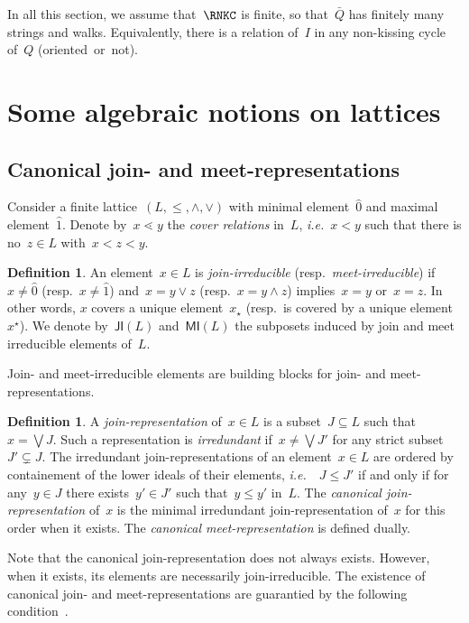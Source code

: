 \documentclass{amsart}
\theoremstyle{definition}
\newtheorem{definition}[theorem]{Definition}
\newcommand{\ie}{\textit{i.e.}~} %
\newcommand{\darkblue}{\color{darkblue}} %
\newcommand{\defn}[1]{\textsl{\darkblue #1}} %
\newcommand{\meet}{\wedge} %
\newcommand{\join}{\vee} %
\newcommand{\bigJoin}{\bigvee} %
\newcommand{\JI}{\mathsf{JI}} %
\newcommand{\MI}{\mathsf{MI}} %
\begin{document}
In all this section, we assume that~$\RNKC$ is finite, so that~$\bar Q$ has finitely many strings and walks.
Equivalently, there is a relation of~$I$ in any non-kissing cycle of~$Q$ (oriented~or~not).

\section{Some algebraic notions on lattices}
\label{sec:recollectionLattice}

\subsection{Canonical join- and meet-representations}
\label{subsec:joinIrreducibleRep}

Consider a finite lattice~$(L,\le,\meet,\join)$ with minimal element~$\hat 0$ and maximal element~$\hat 1$.
Denote by~$x \lessdot y$ the \defn{cover relations} in~$L$, \ie $x < y$ such that there is no~$z \in L$ with~$x < z < y$.

\begin{definition}
An element~$x \in L$ is \defn{join-irreducible} (resp.~\defn{meet-irreducible}) if~$x \ne \hat 0$ (resp.~$x \ne \hat 1$) and~$x = y \join z$ (resp.~$x = y \meet z$) implies~$x = y$ or~$x = z$.
In other words, $x$ covers a unique element~$x_\star$ (resp.~is covered by a unique element~$x^\star$).
We denote by~$\JI(L)$ and~$\MI(L)$ the subposets induced by join and meet irreducible elements of~$L$.
\end{definition}

Join- and meet-irreducible elements are building blocks for join- and meet-representations.

\begin{definition}
A \defn{join-representation} of~$x \in L$ is a subset~$J \subseteq L$ such that~$x = \bigJoin J$.
Such a representation is \defn{irredundant} if~$x \ne \bigJoin J'$ for any strict subset~$J' \subsetneq J$.
The irredundant join-representations of an element~$x \in L$ are ordered by containement of the lower ideals of their elements, \ie~$J \le J'$ if and only if for any~$y \in J$ there exists~$y' \in J'$ such that~$y \le y'$ in~$L$.
The \defn{canonical join-representation} of~$x$ is the minimal irredundant join-representation of~$x$ for this order when it exists.
The \defn{canonical meet-representation} is defined dually.
\end{definition}

Note that the canonical join-representation does not always exists.
However, when it exists, its elements are necessarily join-irreducible.
The existence of canonical join- and meet-representations are guarantied by the following condition~\cite[Thm.~2.24]{FreeseNation}.
\end{document}
